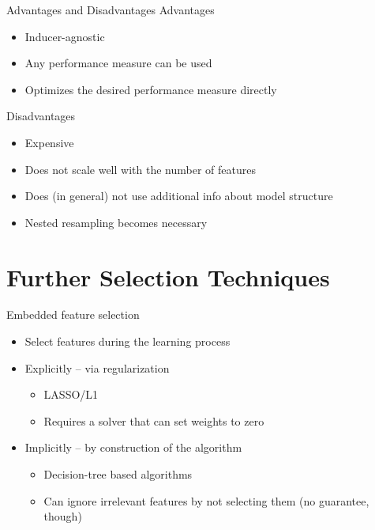 \documentclass[11pt,compress,t,notes=noshow, xcolor=table]{beamer}
\begin{document}
\begin{frame}{Advantages and Disadvantages}
    Advantages
    \begin{itemize}
        \item Inducer-agnostic
        \item Any performance measure can be used
        \item Optimizes the desired performance measure directly
    \end{itemize}
    Disadvantages
    \begin{itemize}
        \item Expensive
        \item Does not scale well with the number of features
        \item Does (in general) not use additional info about model structure
        \item Nested resampling becomes necessary
    \end{itemize}
    
\end{frame}

\section{Further Selection Techniques}

\begin{frame}{Embedded feature selection}
    \begin{itemize}
        \item Select features during the learning process
        \item Explicitly -- via regularization
        \begin{itemize}
            \item LASSO/L1
            \item Requires a solver that can set weights to zero
        \end{itemize}
        \item Implicitly -- by construction of the algorithm
        \begin{itemize}
            \item Decision-tree based algorithms
            \item Can ignore irrelevant features by not selecting them (no guarantee, though)
        \end{itemize}
    \end{itemize}
\end{frame}
\end{document}
